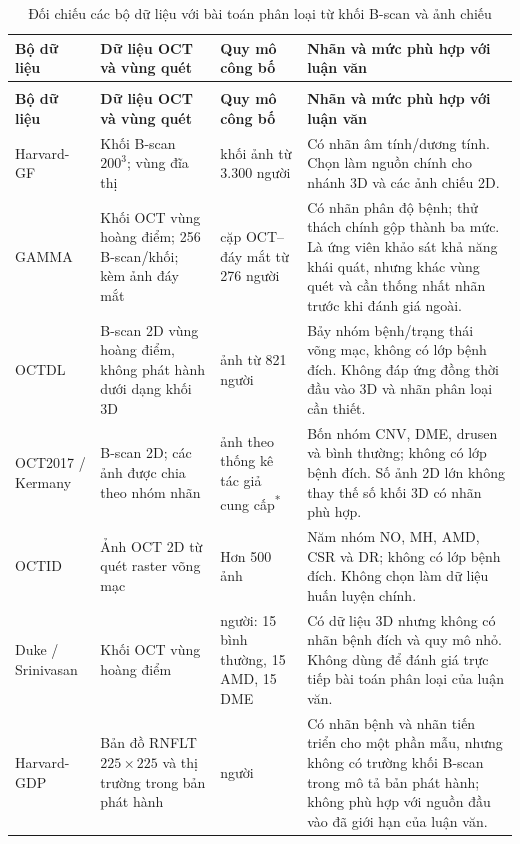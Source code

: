 \begingroup
\setlength{\tabcolsep}{5pt}
\begin{longtable}{@{}>{\RaggedRight\arraybackslash}p{2.2cm}>{\RaggedRight\arraybackslash}p{3.3cm}>{\RaggedRight\arraybackslash}p{2.9cm}>{\RaggedRight\arraybackslash}p{6.1cm}@{}}
  \caption{Đối chiếu các bộ dữ liệu với bài toán phân loại từ khối B-scan và ảnh chiếu}
  \label{tab:dataset-comparison}\\
  \toprule
  \textbf{Bộ dữ liệu} & \textbf{Dữ liệu OCT và vùng quét} &
  \textbf{Quy mô công bố} & \textbf{Nhãn và mức phù hợp với luận văn}\\
  \midrule
  \endfirsthead
  \multicolumn{4}{c}{\textit{Bảng~\thetable{} (tiếp theo)}}\\
  \toprule
  \textbf{Bộ dữ liệu} & \textbf{Dữ liệu OCT và vùng quét} &
  \textbf{Quy mô công bố} & \textbf{Nhãn và mức phù hợp với luận văn}\\
  \midrule
  \endhead
  \bottomrule
  \endfoot
  Harvard-GF \cite{luo2024harvardgf,harvardgfRepo} &
  Khối B-scan $200^3$; vùng đĩa thị &
  3.300 khối ảnh từ 3.300 người &
  Có nhãn âm tính/dương tính. Chọn làm nguồn chính cho nhánh 3D
  và các ảnh chiếu 2D.\\
  \midrule
  GAMMA \cite{wu2022gamma} &
  Khối OCT vùng hoàng điểm; 256 B-scan/khối; kèm ảnh đáy mắt &
  300 cặp OCT--đáy mắt từ 276 người &
  Có nhãn phân độ bệnh; thử thách chính gộp thành ba mức.
  Là ứng viên khảo sát khả năng khái quát, nhưng khác vùng quét
  và cần thống nhất nhãn trước khi đánh giá ngoài.\\
  \midrule
  OCTDL \cite{kulyabin2024octdl} &
  B-scan 2D vùng hoàng điểm, không phát hành dưới dạng khối 3D &
  2.064 ảnh từ 821 người &
  Bảy nhóm bệnh/trạng thái võng mạc, không có lớp bệnh đích.
  Không đáp ứng đồng thời đầu vào 3D và nhãn phân loại cần thiết.\\
  \midrule
  OCT2017 / Kermany \cite{kermany2018data} &
  B-scan 2D; các ảnh được chia theo nhóm nhãn &
  84.484 ảnh theo thống kê tác giả cung cấp\textsuperscript{*} &
  Bốn nhóm CNV, DME, drusen và bình thường; không có lớp bệnh đích.
  Số ảnh 2D lớn không thay thế số khối 3D có nhãn phù hợp.\\
  \midrule
  OCTID \cite{gholami2018octid} &
  Ảnh OCT 2D từ quét raster võng mạc &
  Hơn 500 ảnh &
  Năm nhóm NO, MH, AMD, CSR và DR; không có lớp bệnh đích.
  Không chọn làm dữ liệu huấn luyện chính.\\
  \midrule
  Duke / Srinivasan \cite{srinivasan2014data} &
  Khối OCT vùng hoàng điểm &
  45 người: 15 bình thường, 15 AMD, 15 DME &
  Có dữ liệu 3D nhưng không có nhãn bệnh đích và quy mô nhỏ.
  Không dùng để đánh giá trực tiếp bài toán phân loại của luận văn.\\
  \midrule
  Harvard-GDP \cite{harvardgdpRepo} &
  Bản đồ RNFLT $225\times225$ và thị trường trong bản phát hành &
  1.000 người &
  Có nhãn bệnh và nhãn tiến triển cho một phần mẫu, nhưng không có
  trường khối B-scan trong mô tả bản phát hành; không phù hợp với
  nguồn đầu vào đã giới hạn của luận văn.\\
\end{longtable}

